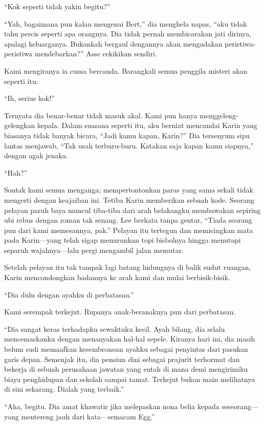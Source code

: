 \documentclass[smalldemyvopaper,11pt,twoside,onecolumn,openright,extrafontsizes]{memoir}
\begin{document}
``Kok seperti tidak yakin begitu?''

``Yah, bagaimana pun kalau mengenai Bert,'' dia menghela napas, ``aku tidak tahu percis seperti apa orangnya. Dia tidak pernah membicarakan jati dirinya, apalagi keluarganya. Bukankah bergaul dengannya akan mengadakan peristiwa-peristiwa mendebarkan?'' Asse cekikikan sendiri.

Kami mengiranya ia cuma bercanda. Barangkali semua penggila misteri akan seperti itu.

``Ih, serius kok!''

Ternyata dia benar-benar tidak masuk akal. Kami pun hanya menggeleng-gelengkan kepala. Dalam suasana seperti itu, aku berniat mencandai Karin yang biasanya tidak banyak bicara, ``Jadi kamu kapan, Karin?'' Dia tersenyum sipu lantas menjawab, ``Tak usah terburu-buru. Katakan saja kapan kamu siapnya,'' dengan agak jenaka.

``Hah?''

Sontak kami semua menganga; mempertontonkan paras yang sama sekali tidak mengerti dengan keajaiban ini. Tetiba Karin memberikan sebuah kode. Seorang pelayan paruh baya muncul tiba-tiba dari arah belakangku membawakan sepiring ubi rebus dengan roman tak senang. Lee berkata tanpa gentar, ``Tiada seorang pun dari kami memesannya, pak.'' Pelayan itu tertegun dan memicingkan mata pada Karin---yang telah sigap menurunkan topi bisbolnya hingga menutupi separuh wajahnya---lalu pergi mengambil jalan memutar.

Setelah pelayan itu tak tampak lagi batang hidungnya di balik sudut ruangan, Karin mencondongkan badannya ke arah kami dan mulai berbisik-bisik.

``Dia dulu dengan ayahku di perbatasan.''

Kami serempak terkejut. Rupanya anak-beranaknya pun dari perbatasan.

``Dia sangat keras terhadapku sewaktuku kecil. Ayah bilang, dia selalu mencemaskanku dengan menanyakan hal-hal sepele. Kiranya hari ini, dia masih belum sudi memaafkan kesembronoan ayahku sebagai penyintas dari pasukan garis depan. Semenjak itu, dia pensiun dini sebagai prajurit terhormat dan bekerja di sebuah perusahaan jawatan yang entah di mana demi mengirimiku biaya penghidupan dan sekolah sampai tamat. Terkejut bukan main melihatnya di sini sekarang. Dialah yang terbaik.''

``Aha, begitu. Dia amat khawatir jika melepaskan nona belia kepada seseorang---yang mentereng jauh dari kata---semacam Egg.''
\end{document}
